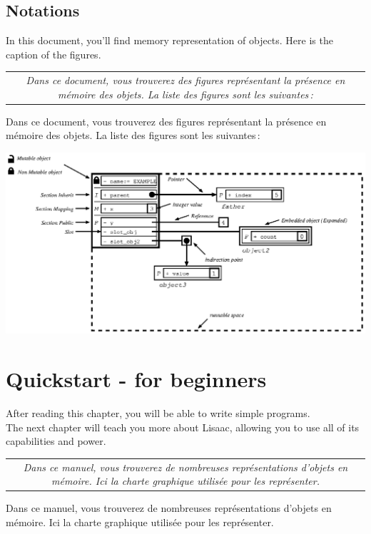 \documentclass[11pt]{mybook}
\newcommand{\fr}[1]{
  \if \frenchversion 1
    \if \englishversion 1    
    \vspace{2mm}
    \noindent\begin{tabular}{|c}
      {
        \begin{minipage}{15.5cm}
          \textit{#1}
        \end{minipage}
      }
    \end{tabular}
    \else
    #1
    \fi
  \fi
}
\newcommand{\en}[1]
{
  \if \englishversion 1
  #1
  \fi
}
\begin{document}
\section{Notations}
\label{introduction:notations}
%
\en{In this document, you'll find memory representation of objects.
Here is the caption of the figures.
}
\fr{Dans ce document, vous trouverez des figures repr\'esentant la pr\'esence en m\'emoire des objets. La liste des figures sont les suivantes\,:}
\begin{center}
	\includegraphics[scale=1]{figures/caption.ps}
\end{center}

\chapter{Quickstart - for beginners}
\label{quickstart}
%
\en{After reading this chapter, you will be able to write simple programs.\\
The next chapter will teach you more about Lisaac, allowing you to use all of its capabilities and power.}

\fr{
	Dans ce manuel, vous trouverez de nombreuses repr\'esentations d'objets en m\'emoire. Ici la charte graphique utilis\'ee pour les repr\'esenter.
}
\end{document}
